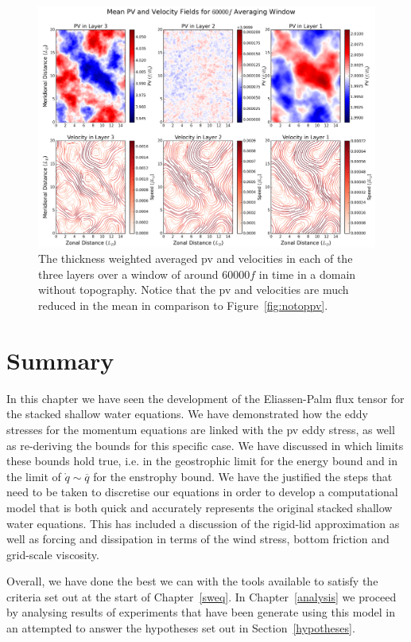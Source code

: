 \documentclass[12pt,a4paper]{report}
\newcommand*\thkmean[1]{\overline{#1}}
\newcommand*\spec[1]{\mathring{#1}}
\newcommand*\figref[1]{Figure~\ref{#1}}
\newcommand*\secref[1]{Section~\ref{#1}}
\begin{document}
  
  \begin{figure}
  	\centering
  	\includegraphics[width=0.8\linewidth]{notopmeanpv}
  	\caption{ The thickness weighted averaged \gls{pv} and velocities in each of the three layers
  		over a window of around $60000 f$ in time in a domain without topography. Notice
  		that the \gls{pv} and velocities are much reduced in the mean in comparison to
  		\figref{fig:notoppv}.}
  	\label{fig:notopmeanpv}
  \end{figure}
  
  \section{Summary}
  
  In this chapter we have seen the development of the Eliassen-Palm flux tensor
  for the stacked shallow water equations. We have demonstrated how the eddy stresses
  for the momentum equations are linked with the \gls{pv} eddy stress, as well
  as re-deriving the bounds for this specific case. We have discussed in which limits
  these bounds hold true, i.e. in the geostrophic limit for the energy bound
  and in the limit of $\spec{q} \sim \thkmean{q}$ for the enstrophy bound. We have the
  justified the steps that need to be taken to discretise our equations in order
  to develop a computational model that is both quick and accurately represents
  the original  stacked shallow water equations. This has included a discussion
  of the rigid-lid approximation as well as forcing and dissipation in terms
  of the wind stress, bottom friction and grid-scale viscosity. 
  
  Overall, we have done the best we can with the tools available to satisfy the
  criteria set out at the start of Chapter~\ref{sweq}. In Chapter~\ref{analysis} we
  proceed by analysing results of experiments that have been generate using this
  model in an attempted to answer the hypotheses set out in \secref{hypotheses}.
\end{document}

